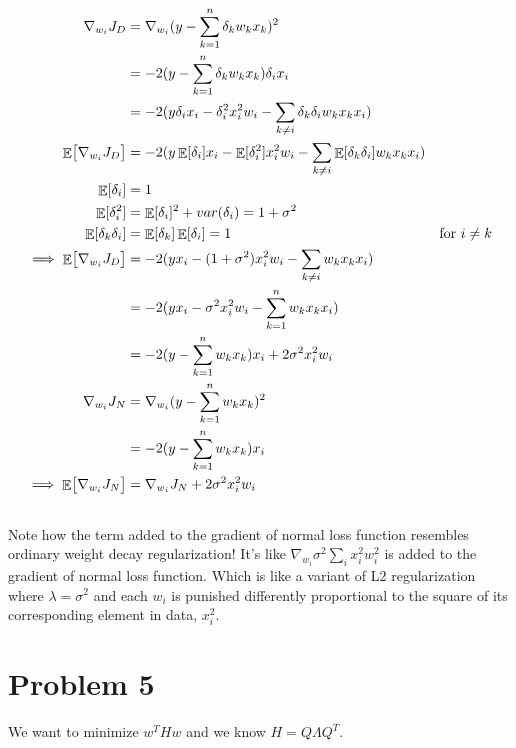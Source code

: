 \documentclass[]{article}
\numberwithin{equation}{section}
\newcommand{\transpose}{^T}
\DeclareMathOperator{\EX}{\mathbb{E}}%
\begin{document}
\subsection{}
\begin{align}
\nabla_{w_i} J_D &= \nabla_{w_i} (y - \sum_{k=1}^n \delta_k w_k x_k)^2\\
&= -2(y - \sum_{k=1}^n \delta_k w_k x_k) \delta_i x_i\\
&= -2(y\delta_i x_i - \delta_i^2 x_i^2 w_i - \sum_{k\neq i} \delta_k \delta_i w_k x_k x_i) \\
\EX\bigl[\nabla_{w_i} J_D\bigr] &= -2(y\EX[\delta_i]x_i - \EX[\delta_i^2] x_i^2 w_i - \sum_{k\neq i} \EX[\delta_k \delta_i] w_k x_k x_i) \\
\EX[\delta_i] &= 1\\
\EX[\delta_i^2] &= \EX[\delta_i]^2 + var(\delta_i) = 1 + \sigma^2\\
\EX[\delta_k \delta_i] &= \EX[\delta_k] \EX[\delta_i] = 1 & \textup{for \(i\neq k\)}\\
\implies \EX\bigl[\nabla_{w_i} J_D\bigr] &= -2(yx_i - (1 + \sigma^2) x_i^2 w_i - \sum_{k\neq i} w_k x_k x_i) \\
&= -2(yx_i - \sigma^2 x_i^2 w_i - \sum_{k=1}^n w_k x_k x_i) \\
&= -2(y - \sum_{k=1}^n w_k x_k) x_i + 2\sigma^2 x_i^2 w_i\\
\nabla_{w_i} J_N &= \nabla_{w_i} (y - \sum_{k=1}^n w_k x_k)^2\\
&= -2(y - \sum_{k=1}^n w_k x_k) x_i\\
\implies \EX\bigl[\nabla_{w_i} J_N\bigr] &= \nabla_{w_i} J_N + 2\sigma^2 x_i^2 w_i
\end{align}

\subsection{}
Note how the term added to the gradient of normal loss function resembles ordinary weight decay regularization!
It's like \(\nabla_{w_i}\sigma^2\sum_i x_i^2 w_i^2\) is added to the gradient of normal loss function.
Which is like a variant of L2 regularization where \(\lambda = \sigma^2\) and each \(w_i\) is punished differently proportional to the square of its corresponding element in data, \(x_i^2\).

\section{Problem 5}
We want to minimize \(w\transpose H w\) and we know \(H=Q\Lambda Q\transpose\).
\end{document}
